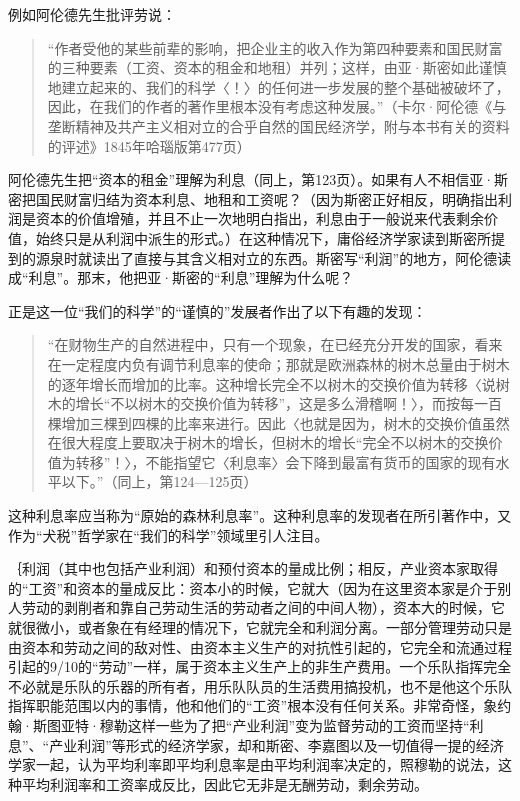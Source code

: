 例如阿伦德先生批评劳说：

\begin{quote}{“作者受他的某些前辈的影响，把企业主的收入作为第四种要素和国民财富的三种要素（工资、资本的租金和地租）并列；这样，由亚·斯密如此谨慎地建立起来的、我们的科学〈！〉的任何进一步发展的整个基础被破坏了，因此，在我们的作者的著作里根本没有考虑这种发展。”（卡尔·阿伦德《与垄断精神及共产主义相对立的合乎自然的国民经济学，附与本书有关的资料的评述》1845年哈瑙版第477页）}\end{quote}

阿伦德先生把“资本的租金”理解为利息（同上，第123页）。如果有人不相信亚·斯密把国民财富归结为资本利息、地租和工资呢？（因为斯密正好相反，明确指出利润是资本的价值增殖，并且不止一次地明白指出，利息由于一般说来代表剩余价值，始终只是从利润中派生的形式。）在这种情况下，庸俗经济学家读到斯密所提到的源泉时就读出了直接与其含义相对立的东西。斯密写“利润”的地方，阿伦德读成“利息”。那末，他把亚·斯密的“利息”理解为什么呢？

正是这一位“我们的科学”的“谨慎的”发展者作出了以下有趣的发现：

\begin{quote}{“在财物生产的自然进程中，只有一个现象，在已经充分开发的国家，看来在一定程度内负有调节利息率的使命；那就是欧洲森林的树木总量由于树木的逐年增长而增加的比率。这种增长完全不以树木的交换价值为转移〈说树木的增长“不以树木的交换价值为转移”，这是多么滑稽啊！〉，而按每一百棵增加三棵到四棵的比率来进行。因此〈也就是因为，树木的交换价值虽然在很大程度上要取决于树木的增长，但树木的增长“完全不以树木的交换价值为转移”！〉，不能指望它〈利息率〉会下降到最富有货币的国家的现有水平以下。”（同上，第124—125页）}\end{quote}

这种利息率应当称为“原始的森林利息率”。这种利息率的发现者在所引著作中，又作为“犬税”哲学家在“我们的科学”领域里引人注目。


｛利润（其中也包括产业利润）和预付资本的量成比例；相反，产业资本家取得的“工资”和资本的量成反比：资本小的时候，它就大（因为在这里资本家是介于别人劳动的剥削者和靠自己劳动生活的劳动者之间的中间人物），资本大的时候，它就很微小，或者象在有经理的情况下，它就完全和利润分离。一部分管理劳动只是由资本和劳动之间的敌对性、由资本主义生产的对抗性引起的，它完全和流通过程引起的9/10的“劳动”一样，属于资本主义生产上的非生产费用。一个乐队指挥完全不必就是乐队的乐器的所有者，用乐队队员的生活费用搞投机，也不是他这个乐队指挥职能范围以内的事情，他和他们的“工资”根本没有任何关系。非常奇怪，象约翰·斯图亚特·穆勒这样一些为了把“产业利润”变为监督劳动的工资而坚持“利息”、“产业利润”等形式的经济学家，却和斯密、李嘉图以及一切值得一提的经济学家一起，认为平均利率即平均利息率是由平均利润率决定的，照穆勒的说法，这种平均利润率和工资率成反比，因此它无非是无酬劳动，剩余劳动。

